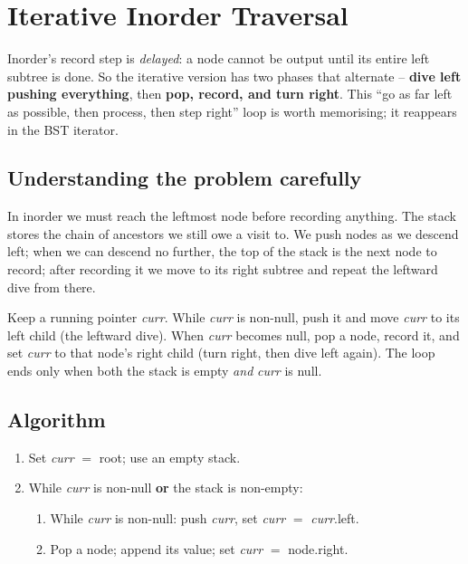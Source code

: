 \section{Iterative Inorder Traversal}
\label{sec:trees-iter-inorder}


\begin{patternbox}
Inorder's record step is \emph{delayed}: a node cannot be output until its
entire left subtree is done. So the iterative version has two phases that
alternate -- \textbf{dive left pushing everything}, then \textbf{pop,
record, and turn right}. This ``go as far left as possible, then process,
then step right'' loop is worth memorising; it reappears in the BST
iterator.
\end{patternbox}

\subsection*{Understanding the problem carefully}

In inorder we must reach the leftmost node before recording anything. The
stack stores the chain of ancestors we still owe a visit to. We push
nodes as we descend left; when we can descend no further, the top of the
stack is the next node to record; after recording it we move to its right
subtree and repeat the leftward dive from there.

\begin{ideabox}
Keep a running pointer \textit{curr}. While \textit{curr} is non-null,
push it and move \textit{curr} to its left child (the leftward dive). When
\textit{curr} becomes null, pop a node, record it, and set \textit{curr}
to that node's right child (turn right, then dive left again). The loop
ends only when both the stack is empty \emph{and} \textit{curr} is null.
\end{ideabox}

\subsection*{Algorithm}

\begin{enumerate}
  \item Set \textit{curr} $=$ root; use an empty stack.
  \item While \textit{curr} is non-null \textbf{or} the stack is
        non-empty:
  \begin{enumerate}
    \item While \textit{curr} is non-null: push \textit{curr}, set
          \textit{curr} $=$ \textit{curr}.left.
    \item Pop a node; append its value; set \textit{curr} $=$
          node.right.
  \end{enumerate}
\end{enumerate}

